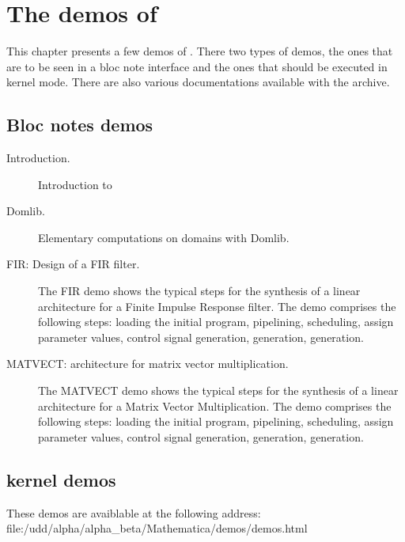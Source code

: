 \chapter{The demos of {\mmalfa}}
\label{demos}
This chapter presents a few demos of {\mmalfa}.
There two types of demos, the ones that are to be seen in a bloc note interface and the ones that should be executed in kernel mode. There are also various documentations available with the archive.

\section{Bloc notes demos}

\begin{description}
 \item [Introduction.] Introduction to {\Alpha}
\item [Domlib.] Elementary computations on domains with Domlib.

 \item [FIR: Design of a FIR filter.]  The FIR demo shows the typical
steps for the synthesis of a linear architecture for a Finite Impulse
Response filter.  The demo comprises the following steps: loading the
initial program, pipelining, scheduling, assign parameter values,
control signal generation, {\alphaz} generation, {\alphard} generation.

 \item [MATVECT: architecture for matrix vector
multiplication.] 
The MATVECT demo shows the typical steps for the
synthesis of a linear architecture for a Matrix Vector Multiplication.
The demo comprises the following steps: loading the initial program,
pipelining, scheduling, assign parameter values, control signal
generation,  {\alphaz} generation, {\alphard} generation.

\end{description}



\section{kernel demos}
These demos are avaiblable at the following address:
{file:/udd/alpha/alpha\_beta/Mathematica/demos/demos.html}

